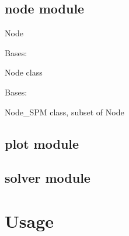 \documentclass[letterpaper,10pt,english]{sphinxmanual}
\begin{document}
\section{node module}
\label{\detokenize{node:module-node}}\label{\detokenize{node:node-module}}\label{\detokenize{node::doc}}
\sphinxAtStartPar
Node

\begin{fulllineitems}
\label{\detokenize{node:node.Node}}
\sphinxAtStartPar
Bases: 

\sphinxAtStartPar
Node class

\end{fulllineitems}


\begin{fulllineitems}
\label{\detokenize{node:node.Node_SPM}}
\sphinxAtStartPar
Bases: {\hyperref[\detokenize{node:node.Node}]{}}

\sphinxAtStartPar
Node\_SPM class, subset of Node

\end{fulllineitems}



\section{plot module}
\label{\detokenize{plot:plot-module}}\label{\detokenize{plot::doc}}

\section{solver module}
\label{\detokenize{solver:solver-module}}\label{\detokenize{solver::doc}}

\chapter{Usage}
\label{\detokenize{usage:usage}}\label{\detokenize{usage::doc}}
\end{document}
